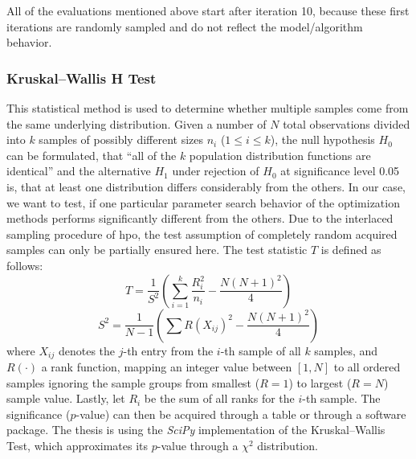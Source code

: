 All of the evaluations mentioned above start after iteration 10, because these first iterations are randomly sampled and do not reflect the model/algorithm behavior.

\subsubsection{Kruskal–Wallis H Test}
\label{chap:kruskal}
This statistical method is used to determine whether multiple samples come from the same underlying distribution. Given a number of $N$ total observations divided into $k$ samples of possibly different sizes $n_i$ ($1 \leq i \leq k$), the null hypothesis $H_0$ can be formulated, that \enquote{all of the $k$ population distribution functions are identical} \cite{conover1999practical} and the alternative $H_1$ under rejection of $H_0$ at significance level 0.05 is, that at least one distribution differs considerably from the others. In our case, we want to test, if one particular parameter search behavior of the optimization methods performs significantly different from the others. Due to the interlaced sampling procedure of \gls{hpo}, the test assumption of completely random acquired samples can only be partially ensured here. The test statistic $T$ is defined as follows:
\begin{equation}
	T = \frac{1}{S^2} \left(  \sum_{i=1}^{k} \frac{R_i^2}{n_i} - \frac{N(N+1)^2}{4}  \right) 
\end{equation}
\begin{equation*}
	S^2 = \frac{1}{N-1} \left(  \sum R(X_{ij})^2 - \frac{N(N+1)^2}{4}  \right) 
\end{equation*}
where $X_{ij}$ denotes the $j$-th entry from the $i$-th sample of all $k$ samples, and $R(\cdot)$ a rank function, mapping an integer value between $\left[ 1,N\right] $ to all ordered samples ignoring the sample groups from smallest ($R = 1$) to largest ($R = N$) sample value. Lastly, let $R_i$ be the sum of all ranks for the $i$-th sample. The significance ($p$-value) can then be acquired through a table or through a software package. The thesis is using the \textit{SciPy} implementation of the Kruskal–Wallis Test, which approximates its $p$-value through a $\chi^2$ distribution.

